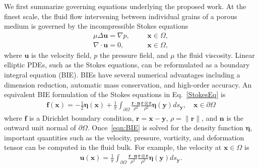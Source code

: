 \documentclass[11pt]{article}
\newcommand{\bvec}[1]{{\mathbf{#1}}}
\newcommand{\grad}{\nabla}
\newcommand{\uu}{\bvec{u}}
\newcommand{\xx}{\bvec{x}}
\newcommand{\nn}{{\mathbf{n}}}
\newcommand{\bd}{\partial}
\newcommand{\eeta}{\boldsymbol{\eta}}
\newcommand{\rr}{\mathbf{r}}
\newcommand{\ff}{\mathbf{f}}
\newcommand{\yy}{\mathbf{y}}
\begin{document}
We first summarize governing equations underlying the proposed work.
At the finest scale, the fluid flow intervening between individual grains of a porous medium is governed by the incompressible Stokes equations
\begin{equation}
\label{StokesEq}
\begin{split}
\mu \Delta \uu = \grad p,	&\hspace{20pt} \xx \in \Omega, \\
\grad \cdot \uu = 0, 		&\hspace{20pt} \xx \in \Omega,
\end{split}
\end{equation}
where $\uu$ is the velocity field, $p$ the pressure field, and $\mu$ the fluid viscosity. Linear elliptic PDEs, such as the Stokes equations, can be reformulated as a boundary integral equation (BIE).  BIEs have several numerical advantages including a dimension reduction, automatic mass conservation, and high-order accuracy. An equivalent BIE formulation of the Stokes equations in Eq.~\eqref{StokesEq} is
\begin{align}
  \label{eqn:BIE}
  \ff(\xx) = -\frac{1}{2}\eeta(\xx) + \frac{1}{\pi} \int_{\bd\Omega}
    \frac{\rr \cdot \nn}{\rho^2} \frac{\rr \otimes \rr}{\rho^2}
    \eeta(\yy) ds_\yy, \quad \xx \in \bd\Omega
\end{align}
where $\ff$ is a Dirichlet boundary condition, $\rr = \xx - \yy$, $\rho = \|\rr\|$, and $\nn$ is the outward unit normal of $\bd\Omega$.  Once~\eqref{eqn:BIE} is solved for the density function $\eeta$, important quantities such as the velocity, pressure, vorticity, and deformation tensor can be computed in the fluid bulk.  For example, the velocity at $\xx \in \Omega$ is 
\begin{align}
  \uu(\xx) = \frac{1}{\pi} \int_{\bd\Omega}
    \frac{\rr \cdot \nn}{\rho^2} \frac{\rr \otimes \rr}{\rho^2}
    \eeta(\yy) ds_\yy.
\end{align}
\end{document}
